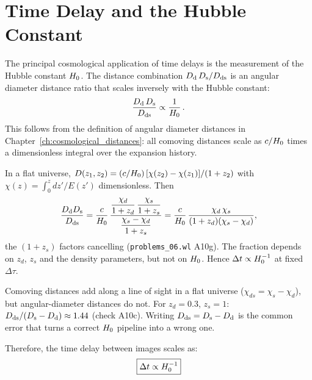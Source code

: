 \section{Time Delay and the Hubble Constant}
\label{sec:time_delay_H0}

The principal cosmological application of time delays is the measurement of
the Hubble constant $H_0$.  The distance combination
$D_{\mathrm{d}}\,D_{\mathrm{s}} / D_{\mathrm{ds}}$ is an angular diameter distance ratio that scales
inversely with the Hubble constant:
\begin{equation}
    \frac{D_{\mathrm{d}}\,D_{\mathrm{s}}}{D_{\mathrm{ds}}} \propto \frac{1}{H_0} \,.
    \label{eq:distance_H0_scaling}
\end{equation}
This follows from the definition of angular diameter distances in
Chapter~\ref{ch:cosmological_distances}: all comoving distances scale as
$c / H_0$ times a dimensionless integral over the
expansion history.

\begin{derivation}
In a flat universe, $D(z_1,z_2) = (c/H_0)\,[\chi(z_2)-\chi(z_1)]/(1+z_2)$
with $\chi(z) = \int_0^z dz'/E(z')$ dimensionless.  Then
\[
  \frac{D_{\mathrm{d}}D_{\mathrm{s}}}{D_{\mathrm{ds}}}
  = \frac{c}{H_0}\,
    \frac{\dfrac{\chi_d}{1+z_d}\,\dfrac{\chi_s}{1+z_s}}{\dfrac{\chi_s-\chi_d}{1+z_s}}
  = \frac{c}{H_0}\,\frac{\chi_d\,\chi_s}{(1+z_d)(\chi_s-\chi_d)} ,
\]
the $(1+z_s)$ factors cancelling (\texttt{problems\_06.wl} A10g).  The
fraction depends on $z_d$, $z_s$ and the density parameters, but not on
$H_0$.  Hence $\Delta t\propto H_0^{-1}$ at fixed $\Delta\tau$.
\end{derivation}

\begin{annotation}[$\Dds\neq\Ds-\Dd$]
Comoving distances add along a line of sight in a flat universe
($\chi_{ds} = \chi_s-\chi_d$), but angular-diameter distances do not.  For
$z_d=0.3$, $z_s=1$: $D_{\mathrm{ds}}/(D_{\mathrm{s}}-D_{\mathrm{d}})\approx1.44$ (check A10c).  Writing
$D_{\mathrm{ds}} = D_{\mathrm{s}}-D_{\mathrm{d}}$ is the common error that turns a correct $H_0$ pipeline into
a wrong one.
\end{annotation}

Therefore, the time delay between images scales as:
\begin{equation}
    \boxed{
    \Delta t \propto H_0^{-1}
    }
    \label{eq:Dt_H0}
\end{equation}

